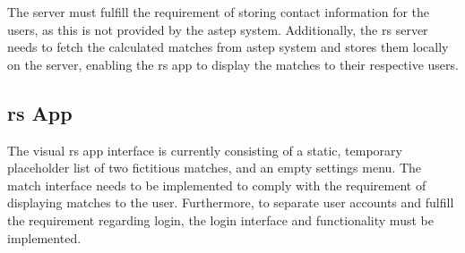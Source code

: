 The server must fulfill the requirement of storing contact information for the users, as this is not provided by the \gls{astep} system.
Additionally, the \gls{rs} server needs to fetch the calculated matches from \gls{astep} system and stores them locally on the server, enabling the \gls{rs} app to display the matches to their respective users.


\subsection{\gls{rs} App}
The visual \gls{rs} app interface is currently consisting of a static, temporary placeholder list of two fictitious matches, and an empty settings menu.
The match interface needs to be implemented to comply with the requirement of displaying matches to the user. Furthermore, to separate user accounts and fulfill the requirement regarding login, the login interface and functionality must be implemented.
